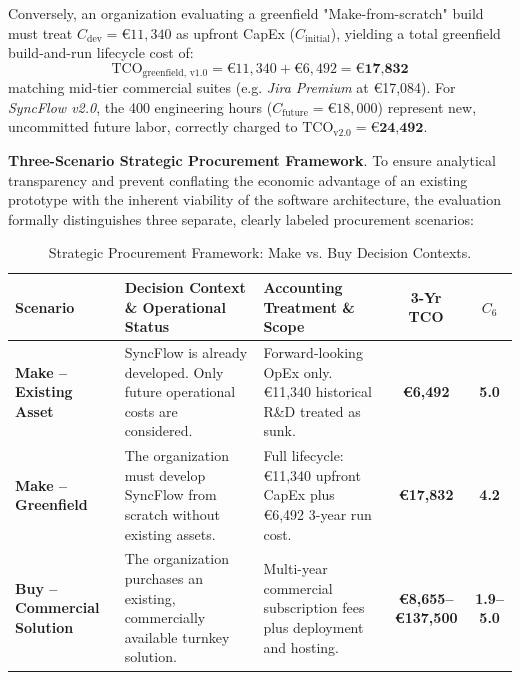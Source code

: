 Conversely, an organization evaluating a greenfield "Make-from-scratch" build must treat $C_{\text{dev}} = \text{€}11,340$ as upfront CapEx ($C_{\text{initial}}$), yielding a total greenfield build-and-run lifecycle cost of:
\begin{equation*}
    \text{TCO}_{\text{greenfield, v1.0}} = \text{€}11,340 + \text{€}6,492 = \textbf{€17,832}
\end{equation*}
matching mid-tier commercial suites (e.g. \textit{Jira Premium} at €17,084). For \textit{SyncFlow v2.0}, the 400 engineering hours ($C_{\text{future}} = \text{€}18,000$) represent new, uncommitted future labor, correctly charged to $\text{TCO}_{\text{v2.0}} = \textbf{€24,492}$.

\vspace{1mm}

\noindent \textbf{Three-Scenario Strategic Procurement Framework}. To ensure analytical transparency and prevent conflating the economic advantage of an existing prototype with the inherent viability of the software architecture, the evaluation formally distinguishes three separate, clearly labeled procurement scenarios:

\begin{table}[H]
\centering
\scriptsize
\setlength{\tabcolsep}{3.5pt}
\renewcommand{\arraystretch}{1.18}
\caption*{Strategic Procurement Framework: Make vs. Buy Decision Contexts.}
\begin{tabularx}{\textwidth}{>{\bfseries}l >{\raggedright}X >{\raggedright}X c c}
\toprule
Scenario & Decision Context \& Operational Status & Accounting Treatment \& Scope & 3-Yr TCO & $C_6$ \\
\midrule
Make -- Existing Asset & SyncFlow is already developed. Only future operational costs are considered. & Forward-looking OpEx only. €11,340 historical R\&D treated as sunk. & \textbf{€6,492} & \textbf{5.0} \\
Make -- Greenfield & The organization must develop SyncFlow from scratch without existing assets. & Full lifecycle: €11,340 upfront CapEx plus €6,492 3-year run cost. & \textbf{€17,832} & \textbf{4.2} \\
Buy -- Commercial Solution & The organization purchases an existing, commercially available turnkey solution. & Multi-year commercial subscription fees plus deployment and hosting. & \textbf{€8,655--€137,500} & \textbf{1.9--5.0} \\
\bottomrule
\end{tabularx}
\end{table}


